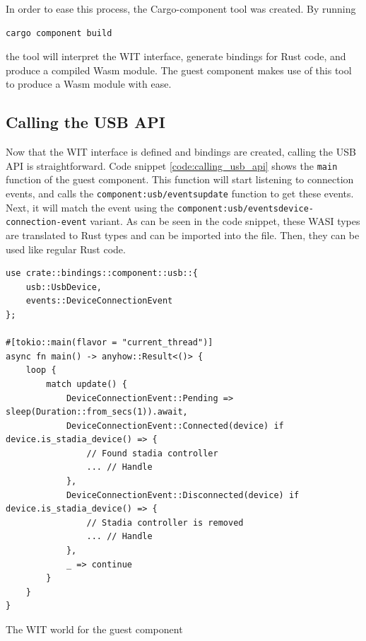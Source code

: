 In order to ease this process, the Cargo-component tool \cite{cargo_component} was created. By running
\begin{verbatim}
cargo component build
\end{verbatim}
the tool will interpret the \acrshort{WIT} interface, generate bindings for Rust code, and produce a compiled \acrshort{Wasm} module. The guest component makes use of this tool to produce a \acrshort{Wasm} module with ease.

\subsection{Calling the \acrshort{USB} \acrshort{API}}
Now that the \acrshort{WIT} interface is defined and bindings are created, calling the USB API is straightforward. Code snippet \ref{code:calling_usb_api} shows the \texttt{main} function of the guest component. This function will start listening to connection events, and calls the \texttt{component:usb/events{update}} function to get these events. Next, it will match the event using the \texttt{component:usb/events{device-connection-event}} variant. As can be seen in the code snippet, these \acrshort{WASI} types are translated to Rust types and can be imported into the file. Then, they can be used like regular Rust code. \\

\begin{code}
\begin{verbatim}
use crate::bindings::component::usb::{
	usb::UsbDevice, 
	events::DeviceConnectionEvent
};

#[tokio::main(flavor = "current_thread")]
async fn main() -> anyhow::Result<()> {
	loop {
		match update() {
			DeviceConnectionEvent::Pending => sleep(Duration::from_secs(1)).await,
			DeviceConnectionEvent::Connected(device) if device.is_stadia_device() => {
				// Found stadia controller
				... // Handle
			},
			DeviceConnectionEvent::Disconnected(device) if device.is_stadia_device() => {
				// Stadia controller is removed
				... // Handle
			},
			_ => continue
		}
	}
}
\end{verbatim} 
\caption{The \acrshort{WIT} world for the guest component}
\label{code:calling_usb_api}
\end{code}

